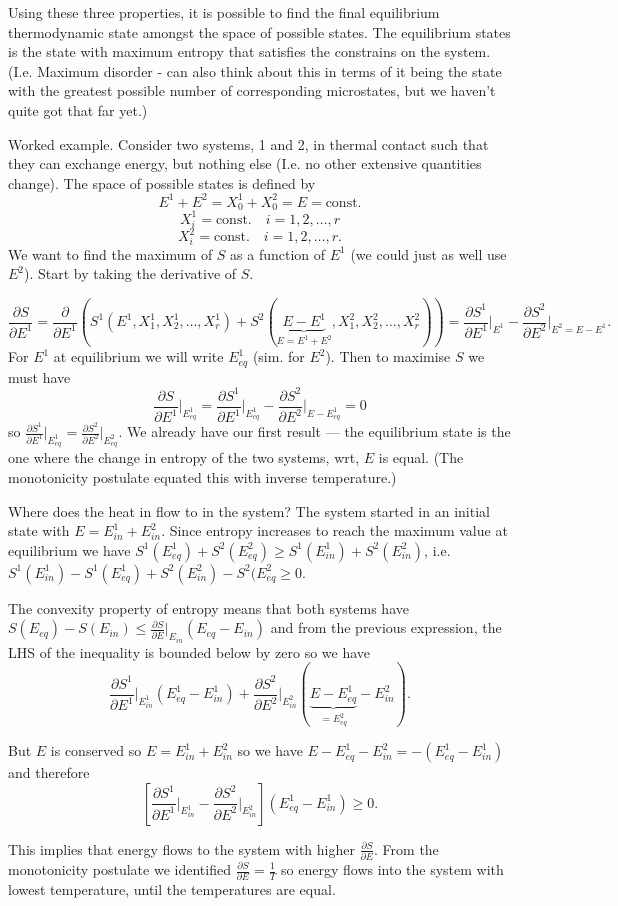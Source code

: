 \documentclass{article}
\begin{document}
Using these three properties, it is possible to find the final equilibrium thermodynamic state amongst the space of possible states. The equilibrium states is the state with maximum entropy that satisfies the constrains on the system. (I.e. Maximum disorder - can also think about this in terms of it being the state with the greatest possible number of corresponding microstates, but we haven't quite got that far yet.)

Worked example. Consider two systems, 1 and 2, in thermal contact such that they can exchange energy, but nothing else (I.e. no other extensive quantities change). The space of possible states is defined by 
$$E^1+E^2 = X_0^1+X_0^2 = E = \text{const.}$$
$$X_i^1 = \text{const.}\quad i=1,2,\ldots,r$$
$$X_i^2 = \text{const.}\quad i=1,2,\ldots,r.$$
We want to find the maximum of $S$ as a function of $E^1$ (we could just as well use $E^2$). Start by taking the derivative of $S$.

$$\frac{\partial S}{\partial E^1} = \frac{\partial}{\partial E^1}\left(S^1(E^1,X_1^1,X_2^1,\ldots,X_r^1) + S^2(\underbrace{E-E^1}_{E=E^1+E^2},X_1^2,X_2^2,\ldots,X_r^2) \right) = \frac{\partial S^1}{\partial E^1}\bigg\vert_{E^1} -  \frac{\partial S^2}{\partial E^2}\bigg\vert_{E^2=E-E^1}.$$
For $E^1$ at equilibrium we will write $E^1_{eq}$ (sim. for $E^2$). Then to maximise $S$ we must have
$$\frac{\partial S}{\partial E^1}\bigg\vert_{E^1_{eq}} = \frac{\partial S^1}{\partial E^1}\bigg\vert_{E^1_{eq}} - \frac{\partial S^2}{\partial E^2}\bigg\vert_{E-E^1_{eq}}=0$$
so $\frac{\partial S^1}{\partial E^1}\vert_{E^1_{eq}} = \frac{\partial S^2}{\partial E^2}\vert_{E_{eq}^2}$. We already have our first result --- the equilibrium state is the one where the change in entropy of the two systems, wrt, $E$ is equal. (The  monotonicity postulate equated this with inverse temperature.)

Where does the heat in flow to in the system? The system started in an initial state with $E = E^1_{in}+E^2_{in}$. Since entropy increases to reach the maximum  value at equilibrium we have $S^1(E^1_{eq}) + S^2(E^2_{eq}) \geq S^1(E^1_{in}) + S^2(E^2_{in})$, i.e. $ S^1(E^1_{in}) - S^1(E^1_{eq})  +  S^2(E^2_{in}) - S^2(E^2_{eq}\geq 0$.

The convexity property of entropy means that both systems have $S(E_{eq})-S(E_{in})\leq \frac{\partial S}{\partial E}\vert_{E_{in}}(E_{eq}-E_{in})$ and from the previous expression, the LHS of the inequality is bounded below by zero so we have
$$\frac{\partial S^1}{\partial E^1}\bigg\vert_{E^1_{in}}(E_{eq}^1-E_{in}^1) + \frac{\partial S^2}{\partial E^2}\bigg\vert_{E^2_{in}}(\underbrace{E-E_{eq}^1}_{=E^2_{eq}}-E_{in}^2).$$

But $E$ is conserved so $E=E^1_{in}+E^2_{in}$ so we have $E-E^1_{eq}-E^2_{in} = -(E^1_{eq}-E^1_{in})$ and therefore
$$\left[\frac{\partial S^1}{\partial E^1}\bigg\vert_{E^1_{in}} - \frac{\partial S^2}{\partial E^2}\bigg\vert_{E^2_{in}}\right]\left(E^1_{eq}-E^1_{in}\right)\geq 0.$$

This implies that energy flows to the  system with higher $\frac{\partial S}{\partial E}$. From the monotonicity postulate we identified  $\frac{\partial S}{\partial E}= \frac{1}{T}$ so energy flows into the system with lowest temperature, until the temperatures are equal.
\end{document}
